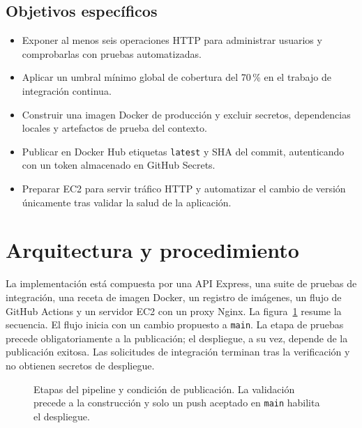 \documentclass[12pt,letterpaper]{article}
\begin{document}
\subsection{Objetivos específicos}
\begin{itemize}
  \item Exponer al menos seis operaciones HTTP para administrar usuarios y comprobarlas con pruebas automatizadas.
  \item Aplicar un umbral mínimo global de cobertura del 70\,\% en el trabajo de integración continua.
  \item Construir una imagen Docker de producción y excluir secretos, dependencias locales y artefactos de prueba del contexto.
  \item Publicar en Docker Hub etiquetas \texttt{latest} y SHA del commit, autenticando con un token almacenado en GitHub Secrets.
  \item Preparar EC2 para servir tráfico HTTP y automatizar el cambio de versión únicamente tras validar la salud de la aplicación.
\end{itemize}

\section{Arquitectura y procedimiento}
La implementación está compuesta por una API Express, una suite de pruebas de integración, una receta de imagen Docker, un registro de imágenes, un flujo de GitHub Actions y un servidor EC2 con un proxy Nginx. La figura~\ref{fig:pipeline} resume la secuencia. El flujo inicia con un cambio propuesto a \texttt{main}. La etapa de pruebas precede obligatoriamente a la publicación; el despliegue, a su vez, depende de la publicación exitosa. Las solicitudes de integración terminan tras la verificación y no obtienen secretos de despliegue.

\begin{figure}[H]
\centering
{}
\caption{Etapas del pipeline y condición de publicación. La validación precede a la construcción y solo un push aceptado en \texttt{main} habilita el despliegue.}
\label{fig:pipeline}
\end{figure}
\end{document}

